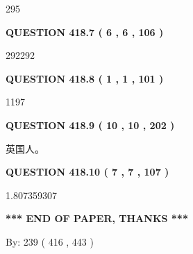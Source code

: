 \documentclass{ctexart}
\begin{document}
295
 
 
  
\vspace{0.2in}
  
{\textbf{\Large{QUESTION
418.7 
 ( 6 , 6 , 106 )
}}}
  
  
 
 
\noindent{}

292292
 
 
  
\vspace{0.2in}
  
{\textbf{\Large{QUESTION
418.8 
 ( 1 , 1 , 101 )
}}}
  
  
 
 
\noindent{}

1197
 
 
  
\vspace{0.2in}
  
{\textbf{\Large{QUESTION
418.9 
 ( 10 , 10 , 202 )
}}}
  
  
 
 
\noindent{}
 
 
英国人。
 
 
 
 
  
\vspace{0.2in}
  
{\textbf{\Large{QUESTION
418.10 
 ( 7 , 7 , 107 )
}}}
  
  
 
 
\noindent{}

1.807359307
 
 
   
   
 \vspace{0.2in}
 
   
   
   
   
\vspace{1.0in} 
{\textbf{\large{ *** END OF PAPER, THANKS *** }}} 
   
   
\hspace{1.0in} By: 
 239 ( 416 ,  443 )
   
   
   
   
\newpage 
\setcounter{page}{ 
   419001 } 
   
\end{document}
